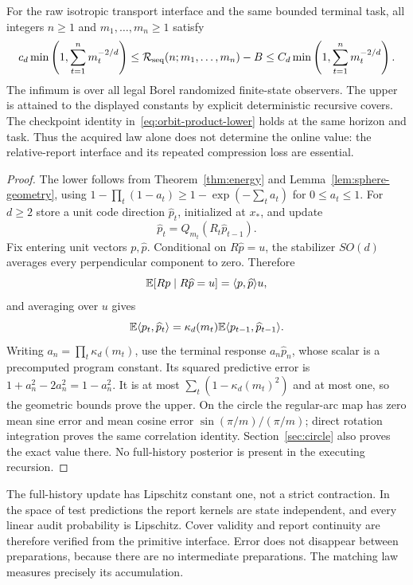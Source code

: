 \begin{theorem}\label{thm:sphere}
For the raw isotropic transport interface and the same bounded terminal task, all integers $n\ge1$ and $m_1,\ldots,m_n\ge1$ satisfy
\begin{equation}\label{eq:sphere-law}
 c_d\min\left(1,\sum_{t=1}^n m_t^{-2/d}\right)
 \le\mathcal R_{\rm seq}(n;m_1,\ldots,m_n)-B
 \le C_d\min\left(1,\sum_{t=1}^n m_t^{-2/d}\right).
\end{equation}
The infimum is over all legal Borel randomized finite-state observers. The upper is attained to the displayed constants by explicit deterministic recursive covers. The checkpoint identity in~\eqref{eq:orbit-product-lower} holds at the same horizon and task. Thus the acquired law alone does not determine the online value: the relative-report interface and its repeated compression loss are essential.
\end{theorem}
\begin{proof}
The lower follows from Theorem~\ref{thm:energy} and Lemma~\ref{lem:sphere-geometry}, using
$1-\prod_t(1-a_t)\ge1-\exp(-\sum_ta_t)$ for $0\le a_t\le1$.
For $d\ge2$ store a unit code direction $\widehat p_t$, initialized at $x_*$, and update
\[
 \widehat p_t=Q_{m_t}(R_t\widehat p_{t-1}).
\]
Fix entering unit vectors $p,\widehat p$. Conditional on $R\widehat p=u$, the stabilizer $SO(d)$ averages every perpendicular component to zero. Therefore
\[
 \mathbb E[Rp\mid R\widehat p=u]=\langle p,\widehat p\rangle u,
\]
and averaging over $u$ gives
\[
 \mathbb E\langle p_t,\widehat p_t\rangle
 =\kappa_d(m_t)\mathbb E\langle p_{t-1},\widehat p_{t-1}\rangle.
\]
Writing $a_n=\prod_t\kappa_d(m_t)$, use the terminal response $a_n\widehat p_n$, whose scalar is a precomputed program constant. Its squared predictive error is
$1+a_n^2-2a_n^2=1-a_n^2$.
It is at most $\sum_t(1-\kappa_d(m_t)^2)$ and at most one, so the geometric bounds prove the upper. On the circle the regular-arc map has zero mean sine error and mean cosine error $\sin(\pi/m)/(\pi/m)$; direct rotation integration proves the same correlation identity. Section~\ref{sec:circle} also proves the exact value there. No full-history posterior is present in the executing recursion.
\end{proof}
The full-history update has Lipschitz constant one, not a strict contraction. In the space of test predictions the report kernels are state independent, and every linear audit probability is Lipschitz. Cover validity and report continuity are therefore verified from the primitive interface. Error does not disappear between preparations, because there are no intermediate preparations. The matching law measures precisely its accumulation.

